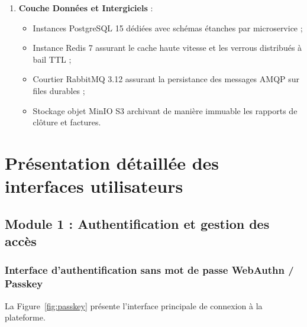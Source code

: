 \begin{enumerate}
\begin{itemize}
        \item \texttt{Billing \& Folio Service} : Comptes folios, calcul fiscal (TVA, TS, TPT) et factures PDF ;
        \item \texttt{Night Audit Service} : Moteur de clôture nocturne transactionnelle et archivage ;
        \item \texttt{Housekeeping Service} : Suivi du nettoyage d'étage et diffusion WebSocket ;
        \item \texttt{Notification Service} : Routage des alertes événementielles temps réel ;
        \item \texttt{Channel Manager Service} : Passerelle de synchronisation avec les plateformes OTA ;
        \item \texttt{Reporting Service} : Calcul des KPI consolidés (RevPAR, ADR, taux d'occupation).
    \end{itemize}
    \item \textbf{Couche Données et Intergiciels} :
    \begin{itemize}
        \item Instances PostgreSQL 15 dédiées avec schémas étanches par microservice ;
        \item Instance Redis 7 assurant le cache haute vitesse et les verrous distribués à bail TTL ;
        \item Courtier RabbitMQ 3.12 assurant la persistance des messages AMQP sur files durables ;
        \item Stockage objet MinIO S3 archivant de manière immuable les rapports de clôture et factures.
    \end{itemize}
\end{enumerate}

\section{Présentation détaillée des interfaces utilisateurs}

\subsection{Module 1 : Authentification et gestion des accès}

\subsubsection{Interface d'authentification sans mot de passe WebAuthn / Passkey}

La Figure~\ref{fig:passkey} présente l'interface principale de connexion à la plateforme.

